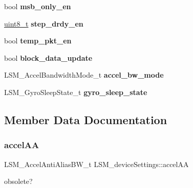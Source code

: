 \begin{DoxyCompactItemize}
bool {\bfseries msb\+\_\+only\+\_\+en}
\item 
\mbox{\label{structLSM__deviceSettings_a8c1826cbc8a9207ba1d0676bf300e47f}} 
\hyperlink{vl53l0x__types_8h_aba7bc1797add20fe3efdf37ced1182c5}{uint8\+\_\+t} {\bfseries step\+\_\+drdy\+\_\+en}
\item 
\mbox{\label{structLSM__deviceSettings_a538b1478215503499fa6c90f4622eb0e}} 
bool {\bfseries temp\+\_\+pkt\+\_\+en}
\item 
\mbox{\label{structLSM__deviceSettings_a5d42118b6dba521f58cbc91dbaa100b5}} 
bool {\bfseries block\+\_\+data\+\_\+update}
\item 
\mbox{\label{structLSM__deviceSettings_a331cd41bef375aba42566805cc1488bc}} 
L\+S\+M\+\_\+\+Accel\+Bandwidth\+Mode\+\_\+t {\bfseries accel\+\_\+bw\+\_\+mode}
\item 
\mbox{\label{structLSM__deviceSettings_a799f004d5fd6341d393e739c7e82c344}} 
L\+S\+M\+\_\+\+Gyro\+Sleep\+State\+\_\+t {\bfseries gyro\+\_\+sleep\+\_\+state}
\end{DoxyCompactItemize}


\subsection{Member Data Documentation}
\mbox{\label{structLSM__deviceSettings_ae9bfe4e1b72fde4f37df849563092908}} 
\subsubsection{\texorpdfstring{accel\+AA}{accelAA}}
{\footnotesize\ttfamily L\+S\+M\+\_\+\+Accel\+Anti\+Alias\+B\+W\+\_\+t L\+S\+M\+\_\+device\+Settings\+::accel\+AA}

obsolete? \mbox{\label{structLSM__deviceSettings_a86ae7e0b0ec3cc7aa48308c788062522}} 
